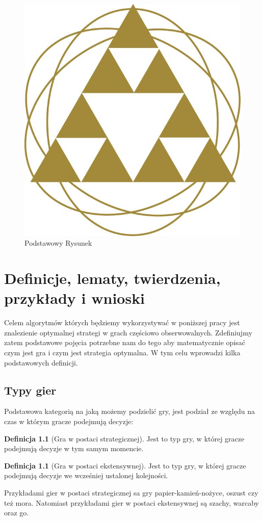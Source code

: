 \documentclass[inzynierska]{pwr_wmat_praca_dyplomowa}
\theoremstyle{plain}
\numberwithin{theorem}{chapter}
\theoremstyle{definition}
\numberwithin{theorem}{chapter}
\newtheorem{definition}[theorem]{Definicja}
\begin{document}
\begin{figure}[ht]

\centering
                     
\includegraphics[scale=0.27]{logo_w13.jpg}
\caption{Podstawowy Rysunek}\label{rys1}
\end{figure}
\label{rys:przykladowy} 


\chapter{Definicje, lematy, twierdzenia, przykłady i wnioski}
Celem algorytmów których będziemy wykorzystywać w poniższej pracy jest znalezienie optymalnej strategi w grach częściowo obserwowalnych. Zdefiniujmy zatem podstawowe pojęcia potrzebne nam do tego aby matematycznie opisać czym jest gra i czym jest strategia optymalna.
W tym celu wprowadzi kilka podstawowych definicji.

\section{Typy gier }
Podstawowa kategorią na jaką możemy podzielić gry, jest podział ze względu na czas w którym gracze podejmują decyzje:

\begin{definition}[Gra w postaci strategicznej]
Jest to typ gry, w której gracze podejmują decyzje w tym samym
momencie.
\end{definition}
\begin{definition}[Gra w postaci ekstensywnej]
	Jest to typ gry, w której gracze podejmują decyzje we wcześniej
	ustalonej kolejności.
\end{definition}
Przykładami gier w postaci strategicznej sa gry papier-kamień-nożyce, oszust czy też mora. Natomiast przykładami gier w postaci ekstensywnej są szachy, warcaby oraz go.
\end{document}
